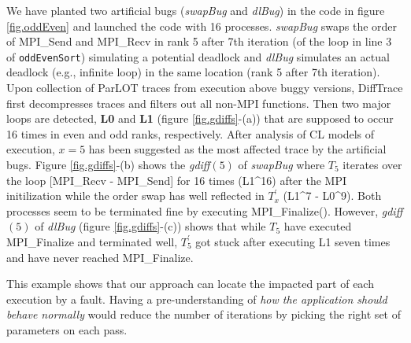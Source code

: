  
%


%
We have planted two artificial bugs (\textit{swapBug} and \textit{dlBug}) in the code in figure \ref{fig.oddEven} and launched the code with 16 processes.
%
\textit{swapBug} swaps the order of MPI\_Send and MPI\_Recv in rank 5 after 7th iteration (of the loop in line 3 of \texttt{oddEvenSort}) simulating a potential deadlock and \textit{dlBug} simulates an actual deadlock (e.g., infinite loop) in the same location (rank 5 after 7th iteration).
%
Upon collection of ParLOT traces from execution above buggy versions, DiffTrace first decompresses traces and filters out all non-MPI functions.
Then two major loops are detected, \textbf{L0} and \textbf{L1}  (figure \ref{fig.gdiffs}-(a)) that are supposed to occur 16 times in even and odd ranks, respectively.
After analysis of CL models of execution, $x=5$ has been suggested as the most affected trace by the artificial bugs.
Figure \ref{fig.gdiffs}-(b) shows the 
\textit{gdiff}$(5)$ of \textit{swapBug} where $T_5$ iterates over the loop [MPI\_Recv - MPI\_Send] for 16 times (L1\^{}16) after the MPI initilization while the order swap has well reflected in $T_x^\prime$ (L1\^{}7 - L0\^{}9). Both processes seem to be terminated fine by executing MPI\_Finalize(). 
However, \textit{gdiff}$(5)$ of \textit{dlBug} (figure \ref{fig.gdiffs}-(c)) shows that while $T_5$ have executed MPI\_Finalize and terminated well, $T_5^\prime$ got stuck after executing L1 seven times and have never reached MPI\_Finalize.

This example shows that our approach can locate the impacted part of each execution by a fault. Having a pre-understanding of \textit{how the application should behave normally} would reduce the number of iterations by picking the right set of parameters on each pass. 





%
